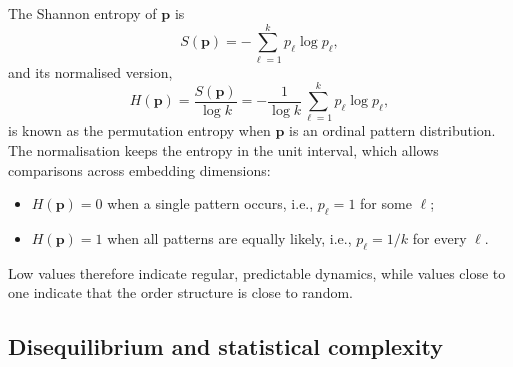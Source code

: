 The Shannon entropy of $\mathbf{p}$ is
\begin{equation}
	S(\mathbf{p})=-\sum_{\ell=1}^{k}p_\ell\log p_\ell ,
	\label{eq:ShannonUnnorm}
\end{equation}
and its normalised version,
\begin{equation}
	H(\mathbf{p})=\frac{S(\mathbf{p})}{\log k}=-\frac{1}{\log k}\sum_{\ell=1}^{k}p_\ell\log p_\ell ,
	\label{eq:NormShannon}
\end{equation}
is known as the permutation entropy when $\mathbf{p}$ is an ordinal pattern distribution. The normalisation keeps the entropy in the unit interval, which allows comparisons across embedding dimensions:
\begin{itemize}
	\item $H(\mathbf{p})=0$ when a single pattern occurs, i.e., $p_\ell=1$ for some $\ell$;
	\item $H(\mathbf{p})=1$ when all patterns are equally likely, i.e., $p_\ell=1/k$ for every $\ell$.
\end{itemize}
Low values therefore indicate regular, predictable dynamics, while values close to one indicate that the order structure is close to random.

\subsection{Disequilibrium and statistical complexity}

